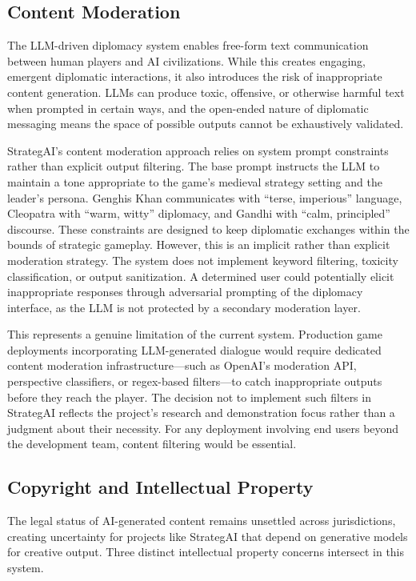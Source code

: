 \documentclass[conference]{IEEEtran}
\begin{document}
\subsection{Content Moderation}

The LLM-driven diplomacy system enables free-form text communication between human players and AI civilizations. While this creates engaging, emergent diplomatic interactions, it also introduces the risk of inappropriate content generation. LLMs can produce toxic, offensive, or otherwise harmful text when prompted in certain ways, and the open-ended nature of diplomatic messaging means the space of possible outputs cannot be exhaustively validated.

StrategAI's content moderation approach relies on system prompt constraints rather than explicit output filtering. The base prompt instructs the LLM to maintain a tone appropriate to the game's medieval strategy setting and the leader's persona. Genghis Khan communicates with ``terse, imperious'' language, Cleopatra with ``warm, witty'' diplomacy, and Gandhi with ``calm, principled'' discourse. These constraints are designed to keep diplomatic exchanges within the bounds of strategic gameplay. However, this is an implicit rather than explicit moderation strategy. The system does not implement keyword filtering, toxicity classification, or output sanitization. A determined user could potentially elicit inappropriate responses through adversarial prompting of the diplomacy interface, as the LLM is not protected by a secondary moderation layer.

This represents a genuine limitation of the current system. Production game deployments incorporating LLM-generated dialogue would require dedicated content moderation infrastructure---such as OpenAI's moderation API, perspective classifiers, or regex-based filters---to catch inappropriate outputs before they reach the player. The decision not to implement such filters in StrategAI reflects the project's research and demonstration focus rather than a judgment about their necessity. For any deployment involving end users beyond the development team, content filtering would be essential.

\subsection{Copyright and Intellectual Property}

The legal status of AI-generated content remains unsettled across jurisdictions, creating uncertainty for projects like StrategAI that depend on generative models for creative output. Three distinct intellectual property concerns intersect in this system.
\end{document}
